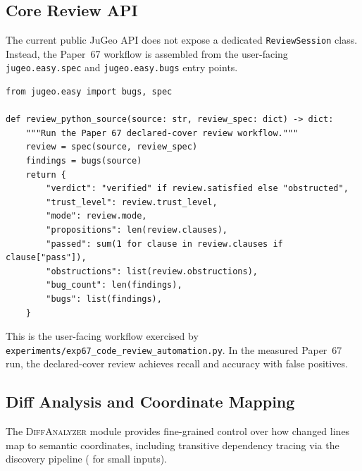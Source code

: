 \documentclass[11pt]{article}
\newcommand{\DiffAnalyzer}{\textsc{DiffAnalyzer}}
\begin{document}
\subsection{Core Review API}

The current public JuGeo API does not expose a dedicated
\texttt{ReviewSession} class. Instead, the Paper~67 workflow is assembled
from the user-facing \texttt{jugeo.easy.spec} and \texttt{jugeo.easy.bugs}
entry points.

\begin{lstlisting}[style=jugeo-python]
from jugeo.easy import bugs, spec

def review_python_source(source: str, review_spec: dict) -> dict:
    """Run the Paper 67 declared-cover review workflow."""
    review = spec(source, review_spec)
    findings = bugs(source)
    return {
        "verdict": "verified" if review.satisfied else "obstructed",
        "trust_level": review.trust_level,
        "mode": review.mode,
        "propositions": len(review.clauses),
        "passed": sum(1 for clause in review.clauses if clause["pass"]),
        "obstructions": list(review.obstructions),
        "bug_count": len(findings),
        "bugs": list(findings),
    }
\end{lstlisting}

This is the user-facing workflow exercised by
\texttt{experiments/exp67\_code\_review\_automation.py}. In the measured
Paper~67 run, the declared-cover review achieves \ppLXVIIrecall{} recall and
\ppLXVIIaccuracyPct{} accuracy with \ppLXVIIfpCount{} false positives.

\subsection{Diff Analysis and Coordinate Mapping}

The \DiffAnalyzer{} module provides fine-grained control over how changed
lines map to semantic coordinates, including transitive dependency tracing
via the discovery pipeline (\subDiscoverypipelineSmallTime{} for small
inputs).
\end{document}
